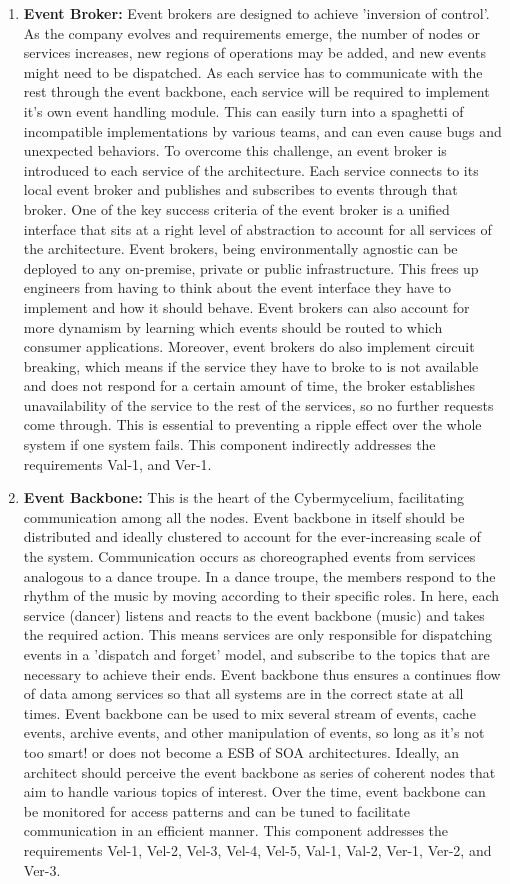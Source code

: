 \documentclass[review]{elsarticle}
\begin{document}
\begin{enumerate}
    \item \textbf{Event Broker:} Event brokers are designed to achieve 'inversion of control'. As the company evolves and requirements emerge, the number of nodes or services increases, new regions of operations may be added, and new events might need to be dispatched. As each service has to communicate with the rest through the event backbone, each service will be required to implement it's own event handling module. This can easily turn into a spaghetti of incompatible implementations by various teams, and can even cause bugs and unexpected behaviors. To overcome this challenge, an event broker is introduced to each service of the architecture. Each service connects to its local event broker and publishes and subscribes to events through that broker. One of the key success criteria of the event broker is a unified interface that sits at a right level of abstraction to account for all services of the architecture. Event brokers, being environmentally agnostic can be deployed to any on-premise, private or public infrastructure. This frees up engineers from having to think about the event interface they have to implement and how it should behave. Event brokers can also account for more dynamism by learning which events should be routed to which consumer applications.  Moreover, event brokers do also implement circuit breaking, which means if the service they have to broke to is not available and does not respond for a certain amount of time, the broker establishes unavailability of the service to the rest of the services, so no further requests come through. This is essential to preventing a ripple effect over the whole system if one system fails. This component indirectly addresses the
    requirements Val-1, and Ver-1.
    \item \textbf{Event Backbone:} This is the heart of the Cybermycelium, facilitating communication among all the nodes. Event backbone in itself should be distributed and ideally clustered to account for the ever-increasing scale of the system. Communication occurs as choreographed events from services analogous to a dance troupe. In a dance troupe, the members respond to the rhythm of the music by moving according to their specific roles. In here, each service (dancer) listens and reacts to the event backbone (music) and takes the required action. This means services are only responsible for dispatching events in a 'dispatch and forget' model, and subscribe to the topics that are necessary to achieve their ends. Event backbone thus ensures a continues flow of data among services so that all systems are in the correct state at all times. Event backbone can be used to mix several stream of events, cache events, archive events, and other manipulation of events, so long as it's not too smart! or does not become a ESB of SOA architectures. Ideally, an architect should perceive the event backbone as series of coherent nodes that aim to handle various topics of interest. Over the time, event backbone can be monitored for access patterns and can be tuned to facilitate communication in an efficient manner. This component addresses the requirements Vel-1, Vel-2, Vel-3, Vel-4, Vel-5, Val-1, Val-2, Ver-1, Ver-2, and Ver-3.

\end{enumerate}
\end{document}
